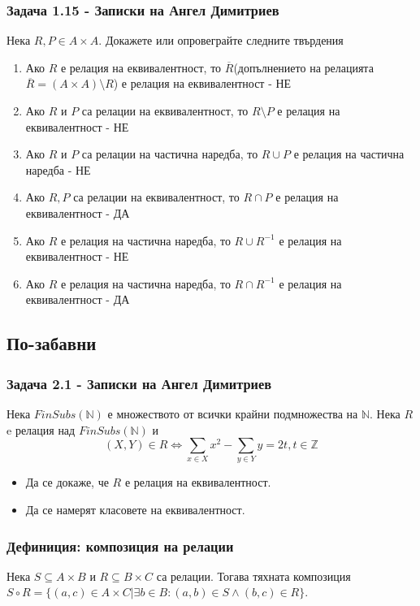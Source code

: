\documentclass[12pt]{article}
\begin{document}
\subsubsection*{Задача 1.15 - Записки на Ангел Димитриев}
Нека $R, P \in A \times A$.
Докажете или опровеграйте следните твърдения
\begin{enumerate}
    \item Ако $R$ е релация на еквивалентност, то $\overline{R}$(допълнението на релацията $\overline{R} = (A \times A) \setminus R$) е релация на еквивалентност - НЕ
    \item Ако $R$ и $P$ са релации на еквивалентност, то $R \setminus P$ е релация на еквивалентност - НЕ
    \item Ако $R$ и $P$ са релации на частична наредба, то $R \cup P$ е релация на частична наредба - НЕ
    \item Ако $R, P$ са релации на еквивалентност, то $R \cap P$ е релация на еквивалентност - ДА
    \item Ако $R$ е релация на частична наредба, то $R \cup R^{-1}$ е релация на еквивалентност - НЕ
    \item Ако $R$ е релация на частична наредба, то $R \cap R^{-1}$ е релация на еквивалентност - ДА
\end{enumerate}

\subsection*{По-забавни}
\subsubsection*{Задача 2.1 - Записки на Ангел Димитриев}
Нека $FinSubs(\mathbb{N})$ е множеството от всички крайни подмножества на $\mathbb{N}$. Нека $R$ e релация над $FinSubs(\mathbb{N})$ и  
\begin{equation*}
    (X, Y) \in R \iff \displaystyle\sum_{x \in X} x^2 - \displaystyle\sum_{y \in Y} y = 2t, t \in \mathbb{Z} 
\end{equation*}
\begin{itemize}
    \item Да се докаже, че $R$ е релация на еквивалентност.
    \item Да се намерят класовете на еквивалентност.
\end{itemize}

\subsubsection*{Дефиниция: композиция на релации}
Нека $S \subseteq A \times B$ и $R \subseteq B \times C$ са релации. Тогава тяхната композиция $S \circ R = \{ (a, c) \in A \times C | \exists b \in B: (a, b) \in S \land (b, c) \in R \}$.
\end{document}

